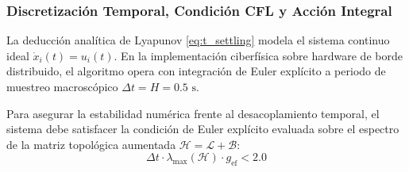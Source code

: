 \subsubsection{Discretización Temporal, Condición CFL y Acción Integral}
La deducción analítica de Lyapunov \eqref{eq:t_settling} modela el sistema continuo ideal $\dot{x}_i(t) = u_i(t)$. En la implementación ciberfísica sobre hardware de borde distribuido, el algoritmo opera con integración de Euler explícito a periodo de muestreo macroscópico $\Delta t = H = 0.5\text{ s}$.

Para asegurar la estabilidad numérica frente al desacoplamiento temporal, el sistema debe satisfacer la condición de Euler explícito evaluada sobre el espectro de la matriz topológica aumentada $\mathcal{H} = \mathcal{L} + \mathcal{B}$:
\begin{equation}\label{eq:cfl_condition}
\Delta t \cdot \lambda_{\max}(\mathcal{H}) \cdot g_{\text{ef}} < 2.0
\end{equation}
